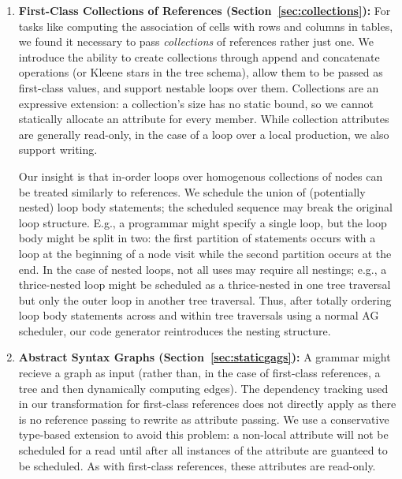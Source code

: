 \begin{enumerate}
\item \textbf{First-Class Collections of References (Section~\ref{sec:collections}):} For tasks like computing the association of cells with rows and columns in tables, we found it necessary to pass \emph{collections} of references rather just one. We introduce the ability to create collections through append and concatenate operations (or Kleene stars in the tree schema), allow them to be passed as first-class values, and support nestable loops over them. Collections are an expressive extension: a collection's size has no static bound, so we cannot statically allocate an attribute for every member. While collection attributes are generally read-only, in the case of a loop over a local production, we also support writing.

Our insight is that in-order loops over homogenous collections of nodes can be treated similarly to references. We schedule the union of (potentially nested) loop body statements; the scheduled sequence may break the original loop structure. E.g., a programmar might specify a single loop, but the loop body might be split in two: the first partition of statements occurs with a loop at the beginning of a node visit while the second partition occurs at the end. In the case of nested loops, not all uses may require all nestings; e.g., a thrice-nested loop might be scheduled as a thrice-nested in one tree traversal but only the outer loop in another tree traversal. Thus, after totally ordering loop body statements across and within tree traversals using a normal AG scheduler, our code generator reintroduces the nesting structure.

\item \textbf{Abstract Syntax Graphs (Section~\ref{sec:staticgags}):} A grammar might recieve a graph as input (rather than, in the case of first-class references, a tree and then dynamically computing edges). The dependency tracking used in our transformation for first-class references does not directly apply as there is no reference passing to rewrite as attribute passing. We use a conservative type-based extension to avoid this problem: a non-local attribute will not be scheduled for a read until after all instances of the attribute are guanteed to be scheduled. As with first-class references, these attributes are read-only.


\end{enumerate}
